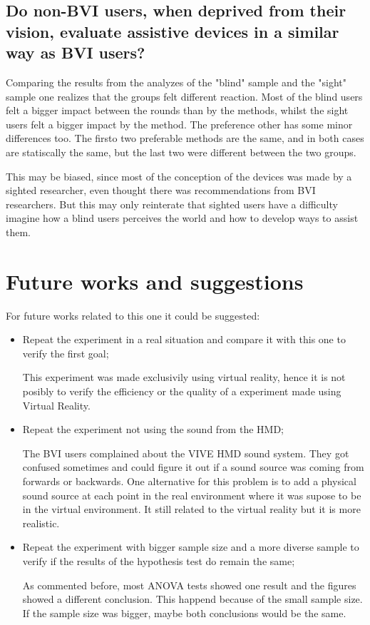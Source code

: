 \subsection*{Do non-BVI users, when deprived from their vision, evaluate assistive devices in a similar way as BVI users?}

Comparing the results from the analyzes of the "blind" sample and the "sight" sample one realizes that the groups felt different reaction. Most of the blind users felt a bigger impact between the rounds than by the methods, whilst the sight users felt a bigger impact by the method. The preference other has some minor differences too. The firsto two preferable methods are the same, and in both cases are statiscally the same, but the last two were different between the two groups.

This may be biased, since most of the conception of the devices was made by a sighted researcher, even thought there was recommendations from BVI researchers. But this may only reinterate that sighted users have a difficulty imagine how a blind users perceives the world and how to develop ways to assist them.



\section{Future works and suggestions}

For future works related to this one it could be suggested:

\begin{itemize}
    \item Repeat the experiment in a real situation and compare it with this one to verify the first goal;
    
    This experiment was made exclusivily using virtual reality, hence it is not posibly to verify the efficiency or the quality of a experiment made using Virtual Reality.

    \item Repeat the experiment not using the sound from the HMD;
     
    The BVI users complained about the VIVE HMD sound system. They got confused sometimes and could figure it out if a sound source was coming from forwards or backwards. One alternative for this problem is to add a physical sound source at each point in the real environment where it was supose to be in the virtual environment. It still related to the virtual reality but it is more realistic. 

    \item Repeat the experiment with bigger sample size and a more diverse sample to verify if the results of the hypothesis test do remain the same;
    
    As commented before, most ANOVA tests showed one result and the figures showed a different conclusion. This happend because of the small sample size. If the sample size was bigger, maybe both conclusions would be the same.

\end{itemize}